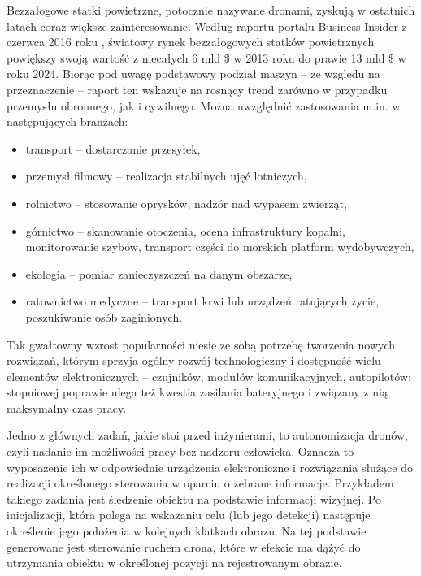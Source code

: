 Bezzałogowe statki powietrzne, potocznie nazywane dronami, zyskują w ostatnich latach coraz większe zainteresowanie. 
Według raportu portalu Business Insider z czerwca 2016 roku \cite{BInsider}, światowy rynek bezzałogowych statków powietrznych powiększy swoją wartość z niecałych 6 mld \$ w 2013 roku do prawie 13 mld \$ w roku 2024. 
Biorąc pod uwagę podstawowy podział maszyn -- ze względu na przeznaczenie -- raport ten wskazuje na rosnący trend zarówno w przypadku przemysłu obronnego, jak i cywilnego. Można uwzględnić zastosowania m.in. w następujących branżach:
\begin{itemize}
	\item transport -- dostarczanie przesyłek,
	\item przemysł filmowy -- realizacja stabilnych ujęć lotniczych,
	\item rolnictwo -- stosowanie oprysków, nadzór nad wypasem zwierząt,
	\item górnictwo -- skanowanie otoczenia, ocena infrastruktury kopalni, monitorowanie szybów, transport części do morskich platform wydobywczych,
	\item ekologia -- pomiar zanieczyszczeń na danym obszarze,
	\item ratownictwo medyczne -- transport krwi lub urządzeń ratujących życie, poszukiwanie osób zaginionych.
\end{itemize}
Tak gwałtowny wzrost popularności niesie ze sobą potrzebę tworzenia nowych rozwiązań, którym sprzyja ogólny rozwój technologiczny i dostępność wielu elementów elektronicznych -- czujników, modułów komunikacyjnych, autopilotów; stopniowej poprawie ulega też kwestia zasilania bateryjnego i związany z nią maksymalny czas pracy. %

Jedno z głównych zadań, jakie stoi przed inżynierami, to autonomizacja dronów, czyli nadanie im możliwości pracy bez nadzoru człowieka.
Oznacza to wyposażenie ich w odpowiednie urządzenia elektroniczne i rozwiązania służące do realizacji określonego sterowania w oparciu o zebrane informacje. Przykładem takiego zadania jest śledzenie obiektu na podstawie informacji wizyjnej. Po inicjalizacji, która polega na wskazaniu celu (lub jego detekcji) następuje określenie jego położenia w kolejnych klatkach obrazu. Na tej podstawie generowane jest sterowanie ruchem drona, które w efekcie ma dążyć do utrzymania obiektu w określonej pozycji na rejestrowanym obrazie.

